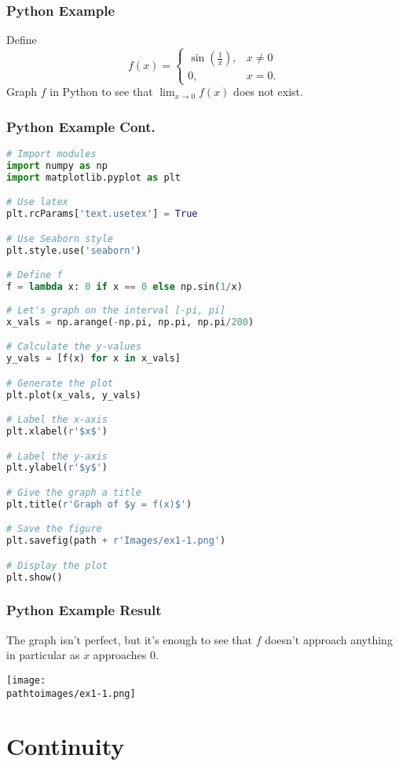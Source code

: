 \documentclass{beamer}
\newcommand{\pathtoimages}{/Users/charlesrambo/Desktop/Bootcamp24/Images}
\begin{document}
\begin{frame}[t]
\frametitle{Python Example}
\begin{Example}
Define
$$
f(x) = \begin{cases} 
\sin\left(\frac{1}{x}\right),	&	x\neq 0\\ 0,	&	x = 0.
\end{cases}
$$
Graph $f$ in Python to see that $\displaystyle\lim_{x\to 0} f(x)$ does not exist.
\end{Example}
\end{frame}

\begin{frame}[fragile]
\frametitle{Python Example Cont.}

\begin{lstlisting}[language=Python]
# Import modules 
import numpy as np
import matplotlib.pyplot as plt

# Use latex
plt.rcParams['text.usetex'] = True

# Use Seaborn style
plt.style.use('seaborn')

# Define f
f = lambda x: 0 if x == 0 else np.sin(1/x)   
        
# Let's graph on the interval [-pi, pi]
x_vals = np.arange(-np.pi, np.pi, np.pi/200)

# Calculate the y-values
y_vals = [f(x) for x in x_vals]

# Generate the plot
plt.plot(x_vals, y_vals)

# Label the x-axis
plt.xlabel(r'$x$')

# Label the y-axis
plt.ylabel(r'$y$')

# Give the graph a title
plt.title(r'Graph of $y = f(x)$')

# Save the figure
plt.savefig(path + r'Images/ex1-1.png')

# Display the plot
plt.show()

\end{lstlisting}
\end{frame}

\begin{frame}
\frametitle{Python Example Result}
The graph isn't perfect, but it's enough to see that $f$ doesn't approach anything in particular as $x$ approaches 0.

\begin{center}
\texttt{[image: \\pathtoimages/ex1-1.png]}
\end{center}
\end{frame}


\section{Continuity} 
\end{document}
